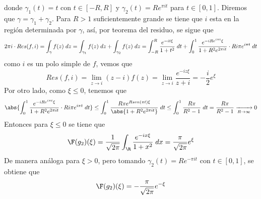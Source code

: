 \documentclass{article}
\begin{document}
\begin{enumerate}
\begin{center}
    \end{center}
    donde $\gamma_{1}(t)=t$ con $t\in[-R,R]$ y $\gamma_{2}(t)=Re^{\pi it}$ para $t\in[0,1]$. 
    Diremos que $\gamma=\gamma_{1}+\gamma_{2}$. Para $R>1$ suficientemente grande se tiene que 
    $i$ esta en la región determinada por $\gamma$, así, por teorema del residuo, se sigue que
    \begin{equation*}
        2\pi i\cdot Res(f,i)=\int_{\gamma}f(z)\hspace{1mm}dz=\int_{\gamma_{1}}f(z)\hspace{1mm}dz
        +\int_{\gamma_{2}}f(z)\hspace{1mm}dz=\int_{-R}^{R}\frac{e^{-it\xi}}{1+t^{2}}\hspace{1mm}dt
        +\int_{0}^{1}\frac{e^{-iRe^{i\pi t}\xi}}{1+R^{2}e^{2\pi it}}\cdot Ri\pi e^{i\pi t}
        \hspace{1mm}dt
    \end{equation*}
    como $i$ es un polo simple de $f$, vemos que
    \begin{equation*}
        Res(f,i)=\lim\limits_{z\to i}(z-i)f(z)=\lim\limits_{z\to i}\frac{e^{-iz\xi}}{z+i}
        =-\frac{i}{2}e^{\xi}
    \end{equation*}
    Por otro lado, como $\xi\leq0$, tenemos que
    \begin{align*}
        \abs{\int_{0}^{1}\frac{e^{-iRe^{i\pi t}\xi}}{1+R^{2}e^{2\pi it}}\cdot Ri\pi e^{i\pi t}
        \hspace{1mm}dt}\leq\int_{0}^{1}\frac{R\pi e^{Rsen(\pi t)\xi}}{\abs{1+R^{2}e^{2\pi it}}}
        \hspace{1mm}dt\leq\int_{0}^{1}\frac{R\pi}{R^{2}-1}\hspace{1mm}dt
        =\frac{R\pi}{R^{2}-1}\xrightarrow[R\to\infty]{}0
    \end{align*}
    Entonces para $\xi\leq0$ se tiene que
    \begin{equation*}
        \F(g_{2})(\xi)=\frac{1}{\sqrt{2\pi}}\int_{\R}\frac{e^{-ix\xi}}{1+x^{2}}\hspace{1mm}dx
        =\frac{\pi}{\sqrt{2\pi}}e^{\xi}
    \end{equation*}
    De manera análoga para $\xi>0$, pero tomando $\gamma_{2}(t)=Re^{-\pi it}$ con $t\in[0,1]$, se 
    obtiene que
    \begin{equation*}
        \F(g_{2})(\xi)=-\frac{\pi}{\sqrt{2\pi}}e^{-\xi}
    \end{equation*}
    

\end{enumerate}
\end{document}
